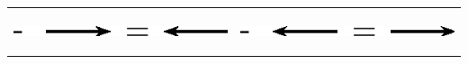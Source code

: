         \begin{center}
      
      \label{m38813*id188875}
      
    \noindent
      \tablelasttail{}
      \begin{xtabular*}{\mytablewidth}[t]{|p{10\mystarwidth}|p{10\mystarwidth}|}\hline
    
    
        
                  
    \setcounter{subfigure}{0}

\label{m38813*id188883}
    \begin{center}
    \label{m38813*id188883!!!underscore!!!media}\label{m38813*id188883!!!underscore!!!printimage}\includegraphics[width=300px]{col11305.imgs/m38813_PG11C1_031.png} %
        
      \vspace{2pt}
    \vspace{.1in}
    
    \end{center}



    \addtocounter{footnote}{-0}
    
                 &
    
    
        
                  
    \setcounter{subfigure}{0}

\label{m38813*id188893}
    \begin{center}
    \label{m38813*id188893!!!underscore!!!media}\label{m38813*id188893!!!underscore!!!printimage}\includegraphics[width=300px]{col11305.imgs/m38813_PG11C1_032.png} %
        
      \vspace{2pt}
    \vspace{.1in}
    
    \end{center}



    \addtocounter{footnote}{-0}
    
     \tabularnewline{}
    \end{xtabular*}
      \end{center}
